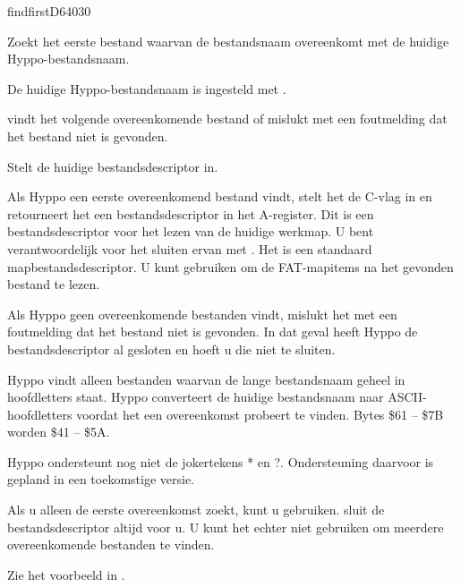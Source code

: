 %
\newpage
\begin{hyppotrap}{findfirst}{D640}{30}

\item [Dienst:]  Zoekt het eerste bestand waarvan de bestandsnaam overeenkomt met de huidige Hyppo-bestandsnaam.
\item [Voorbeding:]  De huidige Hyppo-bestandsnaam is ingesteld met .
\item [Resultaat:]  
\item [Nawerking:]   vindt het volgende overeenkomende bestand of mislukt met een foutmelding dat het bestand niet is gevonden.
\item [Neveneffect:]  Stelt de huidige bestandsdescriptor in.
\item [Foutcodes:]  
\item [Geschiedenis:]
\item [Opmerkingen:]  Als Hyppo een eerste overeenkomend bestand vindt, stelt het de C-vlag in en retourneert het een bestandsdescriptor in het A-register. Dit is een bestandsdescriptor voor het lezen van de huidige werkmap. U bent verantwoordelijk voor het sluiten ervan met . Het is een standaard mapbestandsdescriptor. U kunt  gebruiken om de FAT-mapitems na het gevonden bestand te lezen.

  Als Hyppo geen overeenkomende bestanden vindt, mislukt het met een foutmelding dat het bestand niet is gevonden. In dat geval heeft Hyppo de bestandsdescriptor al gesloten en hoeft u die niet te sluiten.

  Hyppo vindt alleen bestanden waarvan de lange bestandsnaam geheel in hoofdletters staat. Hyppo converteert de huidige bestandsnaam naar ASCII-hoofdletters voordat het een overeenkomst probeert te vinden. Bytes \$61 -- \$7B worden \$41 -- \$5A.

  Hyppo ondersteunt nog niet de jokertekens * en ?. Ondersteuning daarvoor is gepland in een toekomstige versie.

  Als u alleen de eerste overeenkomst zoekt, kunt u  gebruiken.  sluit de bestandsdescriptor altijd voor u. U kunt het echter niet gebruiken om meerdere overeenkomende bestanden te vinden.\item [Voorbeeld:]  Zie het voorbeeld in .
\end{hyppotrap}


